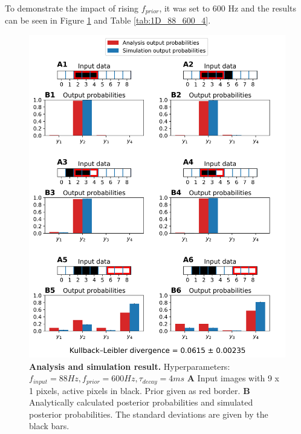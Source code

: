 To demonstrate the impact of rising $f_{prior}$, it was set to 600 Hz and the results can be seen in Figure \ref{fig:1D_88_600_4} and Table \ref{tab:1D_88_600_4}.

\begin{figure}
  \includegraphics[width=\linewidth]{figures/1D/1D_88_600_4.png}
  \caption{\textbf{Analysis and simulation result. } Hyperparameters: $f_{input} = 88 Hz, f_{prior} = 600 Hz, \tau_{decay} = 4 ms$ \textbf{A} Input images with 9 x 1 pixels, active pixels in black. Prior given as red border. \textbf{B} Analytically calculated posterior probabilities and simulated posterior probabilities. The standard deviations are given by the black bars.}
  \label{fig:1D_88_600_4}
\end{figure}

